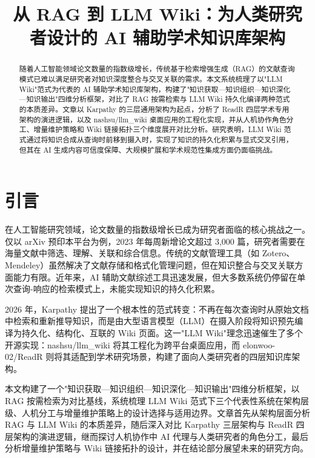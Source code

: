 \documentclass[11pt, a4paper, nonumbering]{SciMasterNoBrand}
\title{从 RAG 到 LLM Wiki：为人类研究者设计的 AI 辅助学术知识库架构}
\begin{document}
\begin{abstract}
随着人工智能领域论文数量的指数级增长，传统基于检索增强生成（RAG）的文献查询模式已难以满足研究者对知识深度整合与交叉关联的需求。本文系统梳理了以"LLM Wiki"范式为代表的 AI 辅助学术知识库架构，构建了"知识获取—知识组织—知识深化—知识输出"四维分析框架，对比了 RAG 按需检索与 LLM Wiki 持久化编译两种范式的本质差异。文章以 Karpathy 的三层通用架构为起点，分析了 ReadR 四层学术专用架构的演进逻辑，以及 nashsu/llm\_wiki 桌面应用的工程化实现，并从人机协作角色分工、增量维护策略和 Wiki 链接拓扑三个维度展开对比分析。研究表明，LLM Wiki 范式通过将知识合成从查询时前移到摄入时，实现了知识的持久化积累与显式交叉引用，但其在 AI 生成内容可信度保障、大规模扩展和学术规范性集成方面仍面临挑战。
\end{abstract}


\maketitle
\newpage
\tableofcontents
\newpage

\section{引言}

在人工智能研究领域，论文数量的指数级增长已成为研究者面临的核心挑战之一。仅以 arXiv 预印本平台为例，2023 年每周新增论文超过 3,000 篇，研究者需要在海量文献中筛选、理解、关联和综合信息\cite{helenakudiabor2024}。传统的文献管理工具（如 Zotero、Mendeley）虽然解决了文献存储和格式化管理问题，但在知识整合与交叉关联方面能力有限\cite{davidmatthews2021}。近年来，AI 辅助文献综述工具迅速发展，但大多数系统仍停留在单次查询-响应的检索模式上，未能实现知识的持久化积累\cite{franciscobolaños2024}。

2026 年，Karpathy 提出了一个根本性的范式转变：不再在每次查询时从原始文档中检索和重新推导知识，而是由大型语言模型（LLM）在摄入阶段将知识预先编译为持久化、结构化、互联的 Wiki 页面\cite{karpathy2026llmwiki}。这一"LLM Wiki"理念迅速催生了多个开源实现：nashsu/llm\_wiki 将其工程化为跨平台桌面应用\cite{su2026llmwiki}，而 elonwoo-02/ReadR 则将其适配到学术研究场景，构建了面向人类研究者的四层知识库架构\cite{woo2026readr}。

本文构建了一个"知识获取—知识组织—知识深化—知识输出"四维分析框架，以 RAG 按需检索为对比基线，系统梳理 LLM Wiki 范式下三个代表性系统在架构层级、人机分工与增量维护策略上的设计选择与适用边界。文章首先从架构层面分析 RAG 与 LLM Wiki 的本质差异，随后深入对比 Karpathy 三层架构与 ReadR 四层架构的演进逻辑，继而探讨人机协作中 AI 代理与人类研究者的角色分工，最后分析增量维护策略与 Wiki 链接拓扑的设计，并在结论部分展望未来的研究方向。
\end{document}
